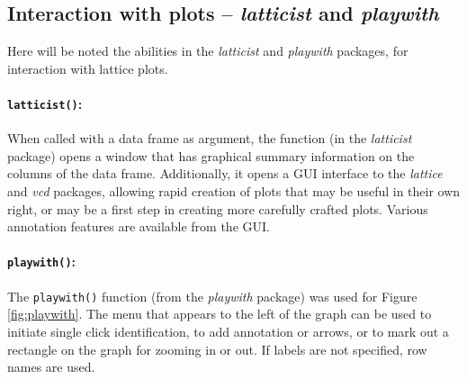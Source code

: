 \subsection{Interaction with plots -- \textit{latticist} and
  \textit{playwith}}\label{ssec:playwith}

  Here will be noted the
abilities in the \textit{latticist} and \textit{playwith} packages,
for interaction with lattice plots.

\paragraph{\texttt{latticist()}:}
When called with a data frame as argument, the function
 (in the \textit{latticist} package) opens a
window that has graphical summary information on the columns of the
data frame.  Additionally, it opens a GUI interface to the
\textit{lattice} and \textit{vcd} packages, allowing rapid creation of
plots that may be useful in their own right, or may be a first step in
creating more carefully crafted plots.  Various annotation features
are available from the GUI.

\paragraph{\texttt{playwith()}:}
The \texttt{playwith()}  function (from the \textit{playwith}
package) was used for Figure \ref{fig:playwith}.  The menu that
appears to the left of the graph can be used to initiate single
click identification, to add annotation or arrows, or to mark
out a rectangle on the graph for zooming in or out.  If labels
are not specified, row names are used.
\vspace*{6pt}

